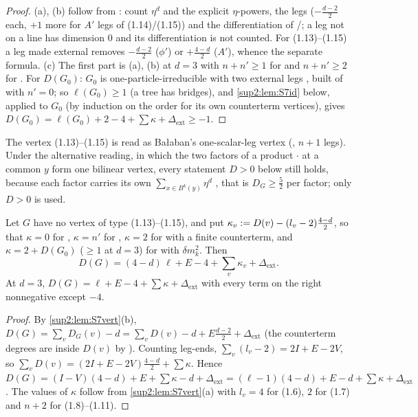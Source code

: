 \begin{proof}
(a), (b) follow from \cite[(2.1)]{Ba3}: count $\eta^d$ and the explicit $\eta$-powers, the legs ($-\frac{d-2}2$ each, $+1$ more for $A'$ legs of (1.14)/(1.15)) and the differentiation of \cite[(1.8)]{Ba3}/\cite[(1.9)]{Ba3}; a leg not on a line has dimension $0$ and its differentiation is not counted. For (1.13)--(1.15) a leg made external removes $-\frac{d-2}2$ ($\phi'$) or $+\frac{4-d}2$ ($A'$), whence the separate formula. (c) The first part is (a), (b) at $d=3$ with $n+n'\ge1$ for \cite[(1.8)]{Ba3} and $n+n'\ge2$ for \cite[(1.10)]{Ba3}. For $D(G_0)$: $G_0$ is one-particle-irreducible with two external legs \cite[pp.~416--417]{Ba3}, built of \cite[(1.6), (1.7), (1.8), (1.10)]{Ba3} with $n'=0$; so $\ell(G_0)\ge1$ (a tree has bridges), and \cref{sup2:lem:S7id} below, applied to $G_0$ (by induction on the order for its own counterterm vertices), gives $D(G_0)=\ell(G_0)+2-4+\sum\kappa+\Delta_{\mathrm{ext}}\ge-1$.
\end{proof}

The vertex (1.13)--(1.15) is read as Ba{\l}aban's one-scalar-leg vertex (\cite[p.~423 (v)]{Ba3}, $n+1$ legs). Under the alternative reading, in which the two factors of a product \cite[(1.14)]{Ba3}$\cdot$\cite[(1.15)]{Ba3} at a common $y$ form one bilinear vertex, every statement $D>0$ below still holds, because each factor carries its own $\sum_{x\in B^k(y)}\eta^d$ \cite[p.~414]{Ba3}, that is $D_G\ge\frac52$ per factor; only $D>0$ is used.

\begin{lemma}\label{sup2:lem:S7id}
Let $G$ have no vertex of type (1.13)--(1.15), and put $\kappa_v:= D(v)-(l_v-2)\frac{4-d}2$, so that $\kappa=0$ for \cite[(1.6)]{Ba3}, $\kappa=n'$ for \cite[(1.8)--(1.11)]{Ba3}, $\kappa=2$ for \cite[(1.7)]{Ba3} with a finite counterterm, and $\kappa=2+D(G_0)$ ($\ge1$ at $d=3$) for \cite[(1.7)]{Ba3} with $\delta m^2_k$. Then
\[
D(G)=(4-d)\,\ell+E-4+\sum_v\kappa_v+\Delta_{\mathrm{ext}}.
\]
At $d=3$, $D(G)=\ell+E-4+\sum\kappa+\Delta_{\mathrm{ext}}$ with every term on the right nonnegative except $-4$.
\end{lemma}

\begin{proof}
By \cref{sup2:lem:S7vert}(b), $D(G)=\sum_vD_G(v)-d=\sum_vD(v)-d+E\frac{d-2}2+\Delta_{\mathrm{ext}}$ (the counterterm degrees are inside $D(v)$ by \cite[(2.3)]{Ba3}). Counting leg-ends, $\sum_v(l_v-2)=2I+E-2V$, so $\sum_vD(v)=(2I+E-2V)\frac{4-d}2+\sum\kappa$. Hence $D(G)=(I-V)(4-d)+E+\sum\kappa-d+\Delta_{\mathrm{ext}}=(\ell-1)(4-d)+E-d+\sum\kappa+\Delta_{\mathrm{ext}}$. The values of $\kappa$ follow from \cref{sup2:lem:S7vert}(a) with $l_v=4$ for (1.6), $2$ for (1.7) and $n+2$ for (1.8)--(1.11).
\end{proof}

